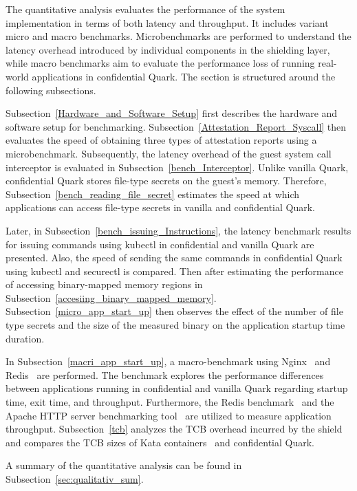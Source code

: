The quantitative analysis evaluates the performance of the system implementation in terms of both latency and throughput. It includes variant micro and macro benchmarks. Microbenchmarks are performed to understand the latency overhead introduced by individual components in the shielding layer, while macro benchmarks aim to evaluate the 
performance loss of running real-world applications in confidential Quark. The section is structured around the following subsections. 

Subsection~\ref{Hardware_and_Software_Setup} first describes the hardware and software setup for benchmarking. Subsection~\ref{Attestation_Report_Syscall} then evaluates the speed of obtaining three types of attestation reports using a microbenchmark. Subsequently, the latency overhead of the guest system 
call interceptor is evaluated in Subsection~\ref{bench_Interceptor}. Unlike vanilla Quark, confidential Quark stores file-type secrets on the guest's memory. Therefore, Subsection~\ref{bench_reading_file_secret} estimates the speed at which applications can access file-type secrets in vanilla and confidential Quark.
 
Later, in Subsection~\ref{bench_issuing_Instructions}, the latency benchmark results for issuing commands using kubectl in confidential and vanilla Quark are presented. Also, the speed of sending the same commands in confidential Quark using kubectl and securectl is compared. Then after 
estimating the performance of accessing binary-mapped memory regions in Subsection~\ref{accesiing_binary_mapped_memory}. Subsection~\ref{micro_app_start_up} then observes the effect of the number of file type secrets and the size of the measured binary on the application startup time duration.


In Subsection~\ref{macri_app_start_up},  a macro-benchmark using Nginx~\cite*{nginx} and Redis~\cite*{redis} are performed. The benchmark explores the performance differences between applications running in confidential and vanilla Quark regarding startup time, exit time, and throughput. Furthermore, the Redis benchmark~\cite*{Redis_benchmark} and the 
Apache HTTP server benchmarking tool~\cite*{ab} are utilized to measure application throughput. Subsection~\ref{tcb} analyzes the TCB overhead incurred by the shield and compares the TCB sizes of Kata containers~\cite*{Kata-Containers} and confidential Quark.  

A summary of the quantitative analysis can be found in Subsection~\ref{sec:qualitativ_sum}.


